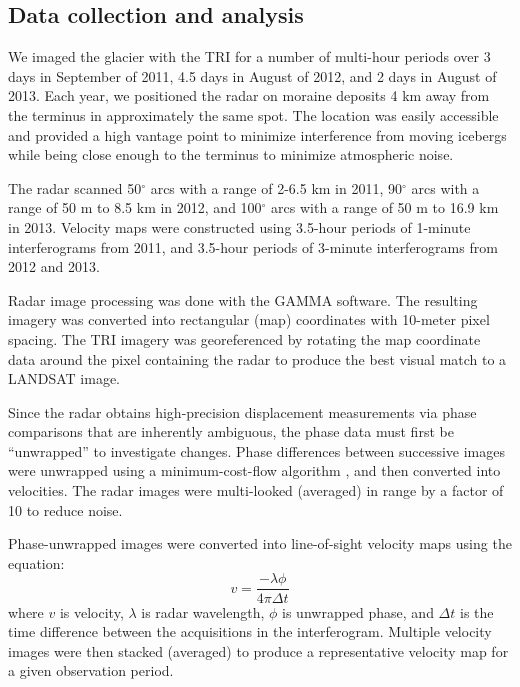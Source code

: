 \subsection{Data collection and analysis}
We imaged the glacier with the TRI for a number of multi-hour periods over 3 days in September of 2011, 4.5 days in August of 2012, and 2 days in August of 2013. Each year, we positioned the radar on moraine deposits  4 km away from the terminus in approximately the same spot. The location was easily accessible and provided a high vantage point to minimize interference from moving icebergs while being close enough to the terminus to minimize atmospheric noise. 


The radar scanned 50$^{\circ}$ arcs with a range of 2-6.5 km in 2011, 90$^{\circ}$ arcs with a range of 50 m to 8.5 km in 2012, and 100$^{\circ}$ arcs with a range of 50 m to 16.9 km in 2013. Velocity maps were constructed using 3.5-hour periods of 1-minute interferograms from 2011, and 3.5-hour periods of 3-minute interferograms from 2012 and 2013.


Radar image processing was done with the GAMMA software. The resulting imagery was converted into rectangular (map) coordinates with 10-meter pixel spacing. 
The TRI imagery was georeferenced by rotating the map coordinate data around the pixel containing the radar to produce the best visual match to a LANDSAT image.

Since the radar obtains high-precision displacement measurements via phase comparisons that are inherently ambiguous, the phase data must first be ``unwrapped'' to investigate changes. Phase differences between successive images were unwrapped using a minimum-cost-flow algorithm \citep{costantini1998novel}, and then converted into velocities. The radar images were multi-looked (averaged) in range by a factor of 10 to reduce noise.

Phase-unwrapped images were converted into line-of-sight velocity maps using the equation:
  \begin{equation}v=\frac{-\lambda\phi}{4\pi\Delta t}\end{equation}  
where $v$ is velocity, $\lambda$ is radar wavelength, $\phi$ is unwrapped phase, and $\Delta t$ is the time difference between the acquisitions in the interferogram. Multiple velocity images were then stacked (averaged) to produce a representative velocity map for a given observation period. 

